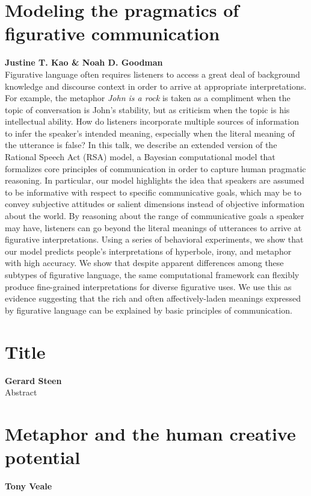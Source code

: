 \documentclass[10pt,letterpaper]{article}
\begin{document}
\section{Modeling the pragmatics of figurative communication}
\large \textbf{Justine T. Kao \& Noah D. Goodman}\\
Figurative language often requires listeners to access a great deal of background knowledge and discourse context in order to arrive at appropriate interpretations. For example, the metaphor \emph{John is a rock} is taken as a compliment when the topic of conversation is John's stability, but as criticism when the topic is his intellectual ability. How do listeners incorporate multiple sources of information to infer the speaker's intended meaning, especially when the literal meaning of the utterance is false? In this talk, we describe an extended version of the Rational Speech Act (RSA) model, a Bayesian computational model that formalizes core principles of communication in order to capture human pragmatic reasoning. In particular, our model highlights the idea that speakers are assumed to be informative with respect to specific communicative goals, which may be to convey subjective attitudes or salient dimensions instead of objective information about the world. By reasoning about the range of communicative goals a speaker may have, listeners can go beyond the literal meanings of utterances to arrive at figurative interpretations. Using a series of behavioral experiments, we show that our model predicts people's interpretations of hyperbole, irony, and metaphor with high accuracy. We show that despite apparent differences among these subtypes of figurative language, the same computational framework can flexibly produce fine-grained interpretations for diverse figurative uses. We use this as evidence suggesting that the rich and often affectively-laden meanings expressed by figurative language can be explained by basic principles of communication.

\section{Title}
\large \textbf{Gerard Steen}\\
Abstract

\section{Metaphor and the human creative potential}
\large \textbf{Tony Veale}
\end{document}
